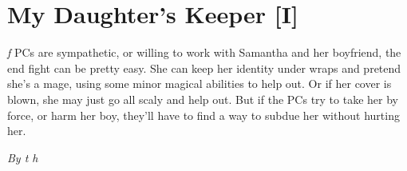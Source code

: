 \documentclass[letterpaper,twocolumn,10.5pt]{article}
\newenvironment{scenario}[6]
	{
		\section{#1 {\small[#2]}}
		\textit{#3}
		\def\TMPSCENARIO{#4 #5}
	}
	{\small\textit{By \TMPSCENARIO}}
\begin{document}
\begin{scenario}{My Daughter's Keeper}
If the PCs are sympathetic, or willing to work with Samantha and her boyfriend, the end fight can be pretty easy. She can keep her identity under wraps and pretend she's a mage, using some minor magical abilities to help out. Or if her cover is blown, she may just go all scaly and help out. But if the PCs try to take her by force, or harm her boy, they'll have to find a way to subdue her without hurting her.

\end{scenario}
\end{document}
